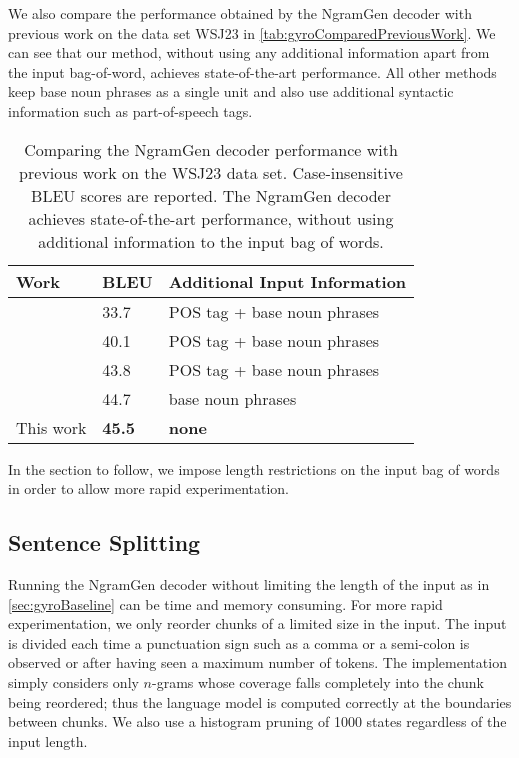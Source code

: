 We also compare the performance obtained by the NgramGen decoder with previous
work on the data set WSJ23 in \autoref{tab:gyroComparedPreviousWork}. We can
see that our method, without using any additional information apart from the
input bag-of-word, achieves state-of-the-art performance.
All other methods keep base noun phrases as a single unit and also use additional
syntactic information such as part-of-speech tags.
%
\begin{table}
\begin{center}
  \begin{tabular}{l|l|l}
    Work & BLEU & Additional Input Information \\
    \hline
    \citep{wan-dras-dale-paris:2009:EACL} & 33.7 & POS tag + base noun phrases\\
    \citep{zhang-clark:2011:EMNLP} & 40.1 & POS tag + base noun phrases \\
    \citep{zhang-blackwood-clark:2012:EACL2012} & 43.8 & POS tag + base noun phrases \\
    \citep{zhang:2013:IJCAI} & 44.7 & base noun phrases \\
    This work & \textbf{45.5} & \textbf{none}
  \end{tabular}
\end{center}
\caption{Comparing the NgramGen decoder performance with previous work
  on the WSJ23 data set. Case-insensitive BLEU scores are reported.
  The NgramGen decoder achieves state-of-the-art
  performance, without using additional information to the input bag of words.}
\label{tab:gyroComparedPreviousWork}
\end{table}

In the section to follow, we impose length restrictions on
the input bag of words in order to allow more rapid experimentation.

\subsection{Sentence Splitting}
\label{sec:sentenceSplitting}

Running the NgramGen decoder without limiting the length of the input
as in \autoref{sec:gyroBaseline} can be time and memory consuming.
For more rapid experimentation, we only reorder chunks of a limited
size in the
input. The input is divided each time a punctuation sign such
as a comma or a semi-colon is observed or after having seen a maximum
number of tokens.
The implementation simply considers only
$n$-grams whose coverage falls completely into
the chunk being reordered; thus the language model
is computed correctly at the boundaries between chunks.
We also use a histogram pruning of 1000 states
regardless of the input length.

